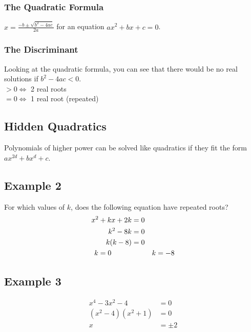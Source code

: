 \documentclass[a4paper,12pt]{article}
\begin{document}
\subsubsection{The Quadratic Formula}
$x = \frac{-b \pm \sqrt{b^2 - 4ac}}{2a}$ for an equation $ax^2 + bx + c = 0$.
\subsubsection*{The Discriminant}
Looking at the quadratic formula, you can see that there would be no real solutions if $b^2 -4ac < 0$. \\
$> 0 \iff$ 2 real roots \\
$= 0 \iff$ 1 real root (repeated) \\
\subsection*{Hidden Quadratics}
Polynomials of higher power can be solved like quadratics if they fit the form $ax^{2d} + bx^{d} + c$.
\subsection*{Example 2}
For which values of $k$, does the following equation have repeated roots? \\
\begin{align*}
x^2 + kx + 2k & = 0 \\
k^2 - 8k & = 0 \\
k(k - 8) & = 0 \\
k = 0 \hspace*{1cm} & \hspace*{1cm} k = -8
\end{align*}
\subsection*{Example 3}
\begin{align*}
x^4 - 3x^2 - 4 & = 0 \\
(x^2 - 4)(x^2 + 1)& = 0 \\
x & = \pm 2 \\
\end{align*}
\end{document}
